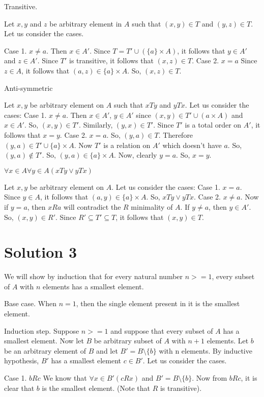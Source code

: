 \documentclass{article}
\begin{document}
Transitive.

Let $x,y$ and $z$ be arbitrary element in $A$ such that $(x,y) \in T$
and $(y,z) \in T$. Let us consider the cases.

Case 1. $x \neq a$. Then $x \in A'$. Since
$T = T' \cup (\{a\} \times A)$, it follows that $y \in A'$ and
$z \in A'$. Since $T'$ is transitive, it follows that $(x,z) \in T$.
Case 2. $x = a$ Since $z \in A$, it follows that
$(a,z) \in \{a\} \times A$. So, $(x,z) \in T$.

Anti-symmetric

Let $x,y$ be arbitrary element on $A$ such that $xTy$ and $yTx$. Let
us consider the cases:
Case 1. $x \neq a$. Then $x \in A'$, $y \in A'$ since $(x,y) \in T'
\cup ({a} \times A)$ and $x \in A'$. So, $(x,y) \in T'$. Similarly,
$(y,x) \in T'$. Since $T'$ is a total order on $A'$, it follows that
$x = y$.
Case 2. $x = a$. So, $(y,a) \in T$. Therefore $(y,a) \in T' \cup \{a\}
\times A$. Now $T'$ is a relation on $A'$ which doesn't have $a$. So,
$(y,a) \notin T'$. So, $(y,a) \in \{a\} \times A$. Now, clearly $y =
a$. So, $x = y$.

$\forall x \in A \forall y \in A (xTy \lor yTx)$

Let $x,y$ be arbitrary element on $A$. Let us consider the cases:
Case 1. $x = a$. Since $y \in A$, it follows that $(a,y) \in \{a\}
\times A$. So, $xTy \lor yTx$.
Case 2. $x \neq a$. Now if $y = a$, then $xRa$ will contradict the $R$
minimality of $A$. If $y \neq a$, then $y \in A'$. So, $(x,y) \in R'$.
Since $R' \subseteq T' \subseteq T$, it follows that $(x,y) \in T$.

\section{Solution 3}
We will show by induction that for every natural number $n >= 1$,
every subset of $A$ with $n$ elements has a smallest element.

Base case. When $n =1$, then the single element present in it is the
smallest element.

Induction step. Suppose $n >= 1$ and suppose that every subset of $A$
has a smallest element. Now let $B$ be arbitrary subset of $A$ with
$n+1$ elements. Let $b$ be an arbitrary element of $B$ and let
$B' = B \setminus \{b\}$ with n elements. By inductive hypothesis,
$B'$ has a smallest element $c \in B'$. Let us consider the cases.

Case 1. $bRc$ We know that $\forall x \in B'(cRx)$ and $B' = B
\setminus \{b\}$.
Now from $bRc$, it is clear that $b$ is the smallest element. (Note
that $R$ is transitive).
\end{document}
